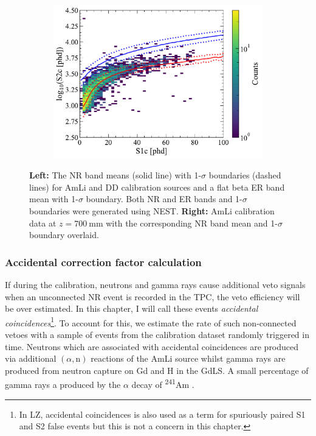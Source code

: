 \begin{enumerate}
\begin{figure}[!ht]
\begin{subfigure}[b]{0.49\textwidth}
        \includegraphics[width=\textwidth]{figures/VetoEfficiency/AmLi700_NRBands.pdf}
        \caption{}
        \label{fig:VetoEff/AmLi700_NRBands}
    \end{subfigure}
    \caption{\textbf{Left:} The NR band means (solid line) with 1-$\sigma$ boundaries (dashed lines) for AmLi and DD calibration sources and a flat beta ER band mean with 1-$\sigma$ boundary. Both NR and ER bands and 1-$\sigma$ boundaries were generated using NEST. \textbf{Right:} AmLi calibration data at $z=700~\text{mm}$ with the corresponding NR band mean and 1-$\sigma$ boundary overlaid.}
    \label{fig:VetoEff/SR3NRBands&AmLi700mmData}
\end{figure}
\end{enumerate}

\subsubsection{Accidental correction factor calculation}\label{sec:VetoEff/AmLiAccCorrection}
If during the calibration, neutrons and gamma rays cause additional veto signals when an unconnected NR event is recorded in the TPC, the veto efficiency will be over estimated. In this chapter, I will call these events \textit{accidental coincidences}\footnote{In LZ, accidental coincidences is also used as a term for spuriously paired S1 and S2 false events but this is not a concern in this chapter.}. To account for this, we estimate the rate of such non-connected vetoes with a sample of events from the calibration dataset randomly triggered in time. Neutrons which are associated with accidental coincidences are produced via additional $(\alpha,\text{n})$ reactions of the AmLi source whilst gamma rays are produced from neutron capture on Gd and H in the GdLS. A small percentage of gamma rays a produced by the $\alpha$ decay of \textsuperscript{241}Am \cite{Sazzad:2023uqs}.


